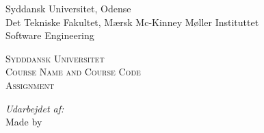 \documentclass[main.tex]{subfiles}
\begin{document}
\begin{titlepage}
\begin{center}

\noindent
\begin{minipage}{0.6\textwidth}
\begin{flushleft} 
\footnotesize
Syddansk Universitet, Odense\\
Det Tekniske Fakultet, Mærsk Mc-Kinney Møller Instituttet \\
Software Engineering\\

\end{flushleft}
\end{minipage}%
\begin{minipage}{0.4\textwidth}
\begin{flushright} 
\small

\end{flushright}
\end{minipage}

\vspace*{50px}

\textsc{\LARGE Sydddansk Universitet}\\[0.5cm]

\textsc{\Large Course Name and Course Code}\\[0.5cm]
\textsc{\Large Assignment}\\[0.5cm]


\vspace*{250px}


\noindent
\begin{minipage}{0.75\textwidth}
\begin{flushleft} 
\small
\emph{Udarbejdet af:}\\
    Made by \\
\end{flushleft}



\end{minipage}

\pagebreak

\end{center}
\end{titlepage}
\end{document}
